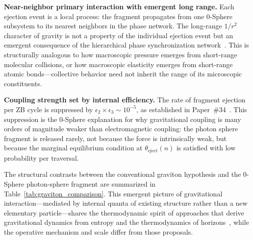 \documentclass[%
 reprint, amsmath,amssymb, aps, prb, ]{revtex4-2}
\numberwithin{equation}{section}
\newcommand{\iphase}{\theta}
\begin{document}
\textbf{Near-neighbor primary interaction with emergent long range.} Each ejection event is a local process: the fragment propagates from one 0-Sphere subsystem to its nearest neighbors in the phase network. The long-range $1/r^2$ character of gravity is not a property of the individual ejection event but an emergent consequence of the hierarchical phase synchronization network~\cite{hanamura34}. This is structurally analogous to how macroscopic pressure emerges from short-range molecular collisions, or how macroscopic elasticity emerges from short-range atomic bonds---collective behavior need not inherit the range of its microscopic constituents.

\textbf{Coupling strength set by internal efficiency.} The rate of fragment ejection per ZB cycle is suppressed by $\epsilon_2 \times \epsilon_3 \sim 10^{-5}$, as established in Paper~\#34~\cite{hanamura34}. This suppression is the 0-Sphere explanation for why gravitational coupling is many orders of magnitude weaker than electromagnetic coupling: the photon sphere fragment is released rarely, not because the force is intrinsically weak, but because the marginal equilibrium condition at $\iphase_{\text{eject}}(n)$ is satisfied with low probability per traversal.


The structural contrasts between the conventional graviton hypothesis and the 0-Sphere photon-sphere fragment are summarized in Table~\ref{tab:graviton_comparison}. This emergent picture of gravitational interaction---mediated by internal quanta of existing structure rather than a new elementary particle---shares the thermodynamic spirit of approaches that derive gravitational dynamics from entropy and the thermodynamics of horizons~\cite{Jacobson1995,Verlinde2011}, while the operative mechanism and scale differ from those proposals.
\end{document}
